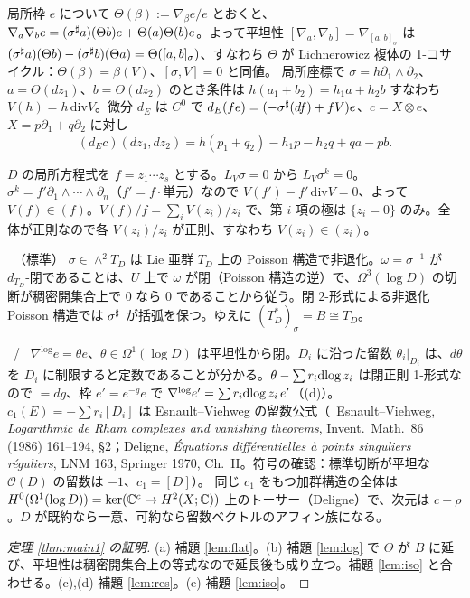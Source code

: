\begin{lem}\tP\label{lem:flat}
局所枠 $e$ について $\Theta(\beta):=\nabla_\beta e/e$ とおくと、$\nabla_a\nabla_be=(\sigma^\sharp a)(\Theta b)e+\Theta(a)\Theta(b)e$。よって平坦性 $[\nabla_a,\nabla_b]=\nabla_{[a,b]_\sigma}$ は
$(\sigma^\sharp a)(\Theta b)-(\sigma^\sharp b)(\Theta a)=\Theta([a,b]_\sigma)$、すなわち $\Theta$ が Lichnerowicz 複体の 1-コサイクル：$\Theta(\beta)=\beta(V)$、$[\sigma,V]=0$ と同値。
局所座標で $\sigma=h\partial_1\wedge\partial_2$、$a=\Theta(dz_1)$、$b=\Theta(dz_2)$ のとき条件は $h(a_1+b_2)=h_1a+h_2b$ すなわち $V(h)=h\,\mathrm{div}V$。微分 $d_E$ は $C^0$ で $d_E(fe)=(-\sigma^\sharp(df)+fV)e$、$c=X\otimes e$、$X=p\partial_1+q\partial_2$ に対し
\[(d_Ec)(dz_1,dz_2)=h(p_1+q_2)-h_1p-h_2q+qa-pb.\]
\end{lem}
\begin{lem}[$V$ は対数的]\tP\label{lem:log}
$D$ の局所方程式を $f=z_1\cdots z_s$ とする。$L_V\sigma=0$ から $L_V\sigma^k=0$。$\sigma^k=f'\partial_1\wedge\cdots\wedge\partial_n$（$f'=f\cdot$単元）なので $V(f')-f'\,\mathrm{div}V=0$、よって $V(f)\in(f)$。$V(f)/f=\sum_iV(z_i)/z_i$ で、第 $i$ 項の極は $\{z_i=0\}$ のみ。全体が正則なので各 $V(z_i)/z_i$ が正則、すなわち $V(z_i)\in(z_i)$。
\end{lem}
\begin{lem}\tP\ （標準）\label{lem:iso}
$\sigma\in\wedge^2T_D$ は Lie 亜群 $T_D$ 上の Poisson 構造で非退化。$\omega=\sigma^{-1}$ が $d_{T_D}$-閉であることは、$U$ 上で $\omega$ が閉（Poisson 構造の逆）で、$\Omega^3(\log D)$ の切断が稠密開集合上で 0 なら 0 であることから従う。閉 2-形式による非退化 Poisson 構造では $\sigma^\sharp$ が括弧を保つ。ゆえに $(T_D^*)_\sigma=B\cong T_D$。
\end{lem}
\begin{lem}[留数・局所標準形・$c_1$]\tP\ /\ \tC\label{lem:res}
$\nabla^{\log}e=\theta e$、$\theta\in\Omega^1(\log D)$ は平坦性から閉。$D_i$ に沿った留数 $\theta_i|_{D_i}$ は、$d\theta$ を $D_i$ に制限すると定数であることが分かる。$\theta-\sum r_i\mathrm{dlog}\, z_i$ は閉正則 1-形式なので $=dg$、枠 $e'=e^{-g}e$ で $\nabla^{\log}e'=\sum r_i\mathrm{dlog}\, z_i\,e'$（(d)）。$c_1(E)=-\sum r_i[D_i]$ は Esnault--Viehweg の留数公式（\tC\ Esnault--Viehweg, \emph{Logarithmic de Rham complexes and vanishing theorems}, Invent.\ Math.\ 86 (1986) 161--194, \S2；Deligne, \emph{\'Equations diff\'erentielles \`a points singuliers r\'eguliers}, LNM 163, Springer 1970, Ch.\ II。符号の確認：標準切断が平坦な $\mathcal O(D)$ の留数は $-1$、$c_1=[D]$）。
同じ $c_1$ をもつ加群構造の全体は $H^0(\Omega^1(\log D))=\ker(\mathbb C^c\to H^2(X;\mathbb C))$ 上のトーサー（Deligne）で、次元は $c-\rho$。$D$ が既約なら一意、可約なら留数ベクトルのアフィン族になる。
\end{lem}
\begin{proof}[定理 \ref{thm:main1} の証明]
(a) 補題 \ref{lem:flat}。(b) 補題 \ref{lem:log} で $\Theta$ が $B$ に延び、平坦性は稠密開集合上の等式なので延長後も成り立つ。補題 \ref{lem:iso} と合わせる。(c),(d) 補題 \ref{lem:res}。(e) 補題 \ref{lem:iso}。
\end{proof}

